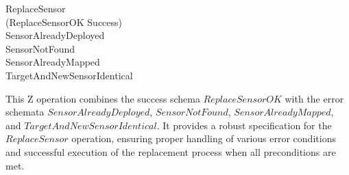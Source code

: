 \documentclass[12pt]{article}
\begin{document}
\begin{spacing}{1.5}
	\begin{zed}
		ReplaceSensor ~\widehat{=} \\
		\indent \quad (ReplaceSensorOK \land Success) \\
		\indent \quad \quad \oplus SensorAlreadyDeployed \\
		\indent \quad \quad \oplus SensorNotFound \\
		\indent \quad \quad \oplus SensorAlreadyMapped \\
		\indent \quad \quad \oplus TargetAndNewSensorIdentical
	\end{zed}
	
	This Z operation combines the success schema $ReplaceSensorOK$ with the error schemata $SensorAlreadyDeployed$, $SensorNotFound$, $SensorAlreadyMapped$, and $TargetAndNewSensorIdentical$. It provides a robust specification for the $ReplaceSensor$ operation, ensuring proper handling of various error conditions and successful execution of the replacement process when all preconditions are met.
	
	
\end{spacing}
\end{document}
